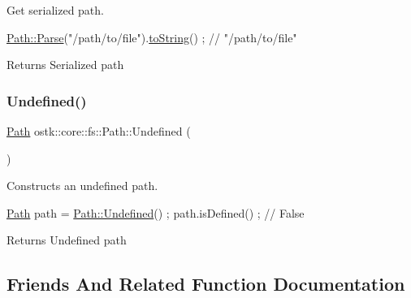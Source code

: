 Get serialized path. 


\begin{DoxyCode}
\hyperlink{classostk_1_1core_1_1fs_1_1_path_ad08539ba654f5df11c4bcb07276345ad}{Path::Parse}(\textcolor{stringliteral}{"/path/to/file"}).\hyperlink{classostk_1_1core_1_1fs_1_1_path_a6153c19e534373b653c3f68b4750f970}{toString}() ; \textcolor{comment}{// "/path/to/file"}
\end{DoxyCode}


\begin{DoxyReturn}{Returns}
Serialized path 
\end{DoxyReturn}
\mbox{\label{classostk_1_1core_1_1fs_1_1_path_a45846b79575fae6e5a7384c06e7c000c}} 
\subsubsection{\texorpdfstring{Undefined()}{Undefined()}}
{\footnotesize\ttfamily \hyperlink{classostk_1_1core_1_1fs_1_1_path}{Path} ostk\+::core\+::fs\+::\+Path\+::\+Undefined (\begin{DoxyParamCaption}{ }\end{DoxyParamCaption})\hspace{0.3cm}{\ttfamily [static]}}



Constructs an undefined path. 


\begin{DoxyCode}
\hyperlink{classostk_1_1core_1_1fs_1_1_path_a1a5fff28594542489223b4cfad6cc9fb}{Path} path = \hyperlink{classostk_1_1core_1_1fs_1_1_path_a45846b79575fae6e5a7384c06e7c000c}{Path::Undefined}() ;
path.isDefined() ; \textcolor{comment}{// False}
\end{DoxyCode}


\begin{DoxyReturn}{Returns}
Undefined path 
\end{DoxyReturn}


\subsection{Friends And Related Function Documentation}
\mbox{\label{classostk_1_1core_1_1fs_1_1_path_a87813ac3ede0b43b50ae6b9fdf0a2815}} 
